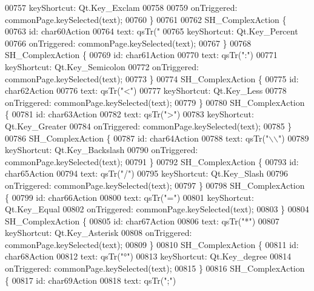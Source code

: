 \begin{DoxyCode}
00757         keyShortcut: Qt.Key\_Exclam
00758 
00759         onTriggered: commonPage.keySelected(text);
00760     \}
00761 
00762     SH\_ComplexAction \{
00763         \textcolor{keywordtype}{id}: char60Action
00764         text: qsTr(\textcolor{stringliteral}{"%
00765         keyShortcut: Qt.Key\_Percent
00766         onTriggered: commonPage.keySelected(text);
00767     \}
00768     SH\_ComplexAction \{
00769         \textcolor{keywordtype}{id}: char61Action
00770         text: qsTr(\textcolor{stringliteral}{":"})
00771         keyShortcut: Qt.Key\_Semicolon
00772         onTriggered: commonPage.keySelected(text);
00773     \}
00774     SH\_ComplexAction \{
00775         \textcolor{keywordtype}{id}: char62Action
00776         text: qsTr(\textcolor{stringliteral}{"<"})
00777         keyShortcut: Qt.Key\_Less
00778         onTriggered: commonPage.keySelected(text);
00779     \}
00780     SH\_ComplexAction \{
00781         \textcolor{keywordtype}{id}: char63Action
00782         text: qsTr(\textcolor{stringliteral}{">"})
00783         keyShortcut: Qt.Key\_Greater
00784         onTriggered: commonPage.keySelected(text);
00785     \}
00786     SH\_ComplexAction \{
00787         \textcolor{keywordtype}{id}: char64Action
00788         text: qsTr(\textcolor{stringliteral}{"\(\backslash\)\(\backslash\)"})
00789         keyShortcut: Qt.Key\_Backslash
00790         onTriggered: commonPage.keySelected(text);
00791     \}
00792     SH\_ComplexAction \{
00793         \textcolor{keywordtype}{id}: char65Action
00794         text: qsTr(\textcolor{stringliteral}{"/"})
00795         keyShortcut: Qt.Key\_Slash
00796         onTriggered: commonPage.keySelected(text);
00797     \}
00798     SH\_ComplexAction \{
00799         \textcolor{keywordtype}{id}: char66Action
00800         text: qsTr(\textcolor{stringliteral}{"="})
00801         keyShortcut: Qt.Key\_Equal
00802         onTriggered: commonPage.keySelected(text);
00803     \}
00804     SH\_ComplexAction \{
00805         \textcolor{keywordtype}{id}: char67Action
00806         text: qsTr(\textcolor{stringliteral}{"*"})
00807         keyShortcut: Qt.Key\_Asterisk
00808         onTriggered: commonPage.keySelected(text);
00809     \}
00810     SH\_ComplexAction \{
00811         \textcolor{keywordtype}{id}: char68Action
00812         text: qsTr(\textcolor{stringliteral}{"°"})
00813         keyShortcut: Qt.Key\_degree
00814         onTriggered: commonPage.keySelected(text);
00815     \}
00816     SH\_ComplexAction \{
00817         \textcolor{keywordtype}{id}: char69Action
00818         text: qsTr(\textcolor{stringliteral}{";"})
}
\end{DoxyCode}
